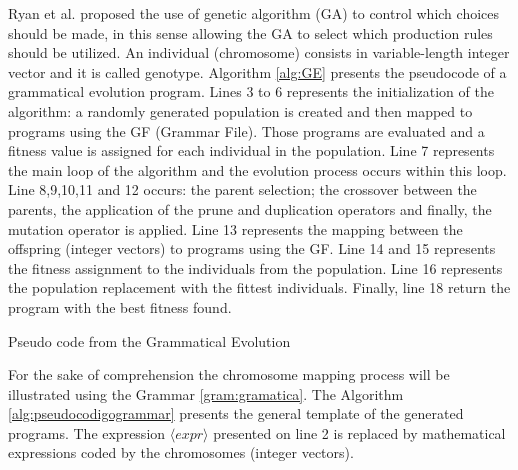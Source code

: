 \documentclass[conference]{IEEEtran}
\begin{document}
Ryan et al. \cite{ryan1998grammatical}  proposed the use of genetic algorithm (GA) to control which choices should be made, in this sense allowing the GA to select which production rules should be utilized. An individual (chromosome) consists in variable-length integer vector and it is called genotype. Algorithm \ref{alg:GE} presents the pseudocode of a grammatical evolution program. Lines 3 to 6 represents the initialization of the algorithm: a randomly generated population is created and then mapped to programs using the GF (Grammar File). Those programs are evaluated and a fitness value is assigned for each individual in the population. Line 7 represents the main loop of the algorithm and the evolution process occurs within this loop. Line 8,9,10,11 and 12 occurs: the parent selection; the crossover between the parents, the application of the prune and duplication operators and finally, the mutation operator is applied. Line 13 represents the mapping between the offspring (integer vectors) to programs using the GF. Line 14 and 15 represents the fitness assignment to the individuals from the population. Line 16 represents the population replacement with the fittest individuals. Finally, line 18 return the program with the best fitness found.


\begin{algorithm}[htb]
	\fontsize{8pt}{10pt}\selectfont
	\caption{Pseudo code from the Grammatical Evolution}
	\label{alg:GE}
\end{algorithm}


For the sake of comprehension the chromosome mapping process will be illustrated using the Grammar \ref{gram:gramatica}. The Algorithm \ref{alg:pseudocodigogrammar} presents the general template of the generated programs. The expression $\langle expr \rangle$ presented on line 2 is replaced by mathematical expressions coded by the chromosomes (integer vectors).
\end{document}
